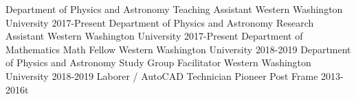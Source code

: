 


\begin{cventries}
\cventry
    {Department of Physics and Astronomy}
    {Teaching Assistant}
    {Western Washington University}
    {2017-Present}
    {}{}
    \vspace{-0.3cm}
\cventry
    {Department of Physics and Astronomy}
    {Research Assistant}
    {Western Washington University}
    {2017-Present}
    {}{}
    \vspace{-0.3cm}
\cventry
    {Department of Mathematics}
    {Math Fellow}
    {Western Washington University}
    {2018-2019}
    {}{}
    \vspace{-0.3cm}
\cventry
    {Department of Physics and Astronomy}
    {Study Group Facilitator}
    {Western Washington University}
    {2018-2019}
    {}{}
    \vspace{-0.3cm}
\cventry
    {}
    {Laborer / AutoCAD Technician}
    {Pioneer Post Frame}
    {2013-2016t}
    {}{}
    \vspace{-0.6cm} 
\end{cventries}


